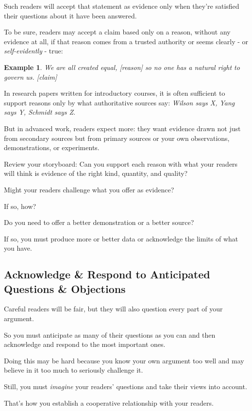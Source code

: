 \documentclass[oneside]{book}
\numberwithin{equation}{section}
\newtheorem{example}{Example}[section]
\begin{document}
Such readers will accept that statement as evidence only when they're satisfied their questions about it have been answered.

%
To be sure, readers may accept a claim based only on a reason, without any evidence at all, if that reason comes from a trusted authority or seems clearly - or \textit{self-evidently} - true:
\begin{example}
    We are all created equal, \emph{[reason]} so no one has a natural right to govern us. \emph{[claim]}
\end{example}
In research papers written for introductory courses, it is often sufficient to support reasons only by what authoritative sources say: \textit{Wilson says X, Yang says Y, Schmidt says Z}.

But in advanced work, readers expect more: they want evidence drawn not just from secondary sources but from primary sources or your own observations, demonstrations, or experiments.

%
Review your storyboard: Can you support each reason with what your readers will think is evidence of the right kind, quantity, and quality?

Might your readers challenge what you offer as evidence?

If so, how?

Do you need to offer a better demonstration or a better source?

If so, you must produce more or better data or acknowledge the limits of what you have.

%

\subsection{Acknowledge \& Respond to Anticipated Questions \& Objections}
Careful readers will be fair, but they will also question every part of your argument.

So you must anticipate as many of their questions as you can and then acknowledge and respond to the most important ones.

Doing this may be hard because you know your own argument too well and may believe in it too much to seriously challenge it.

Still, you must \textit{imagine} your readers' questions and take their views into account.

That's how you establish a cooperative relationship with your readers.
\end{document}
